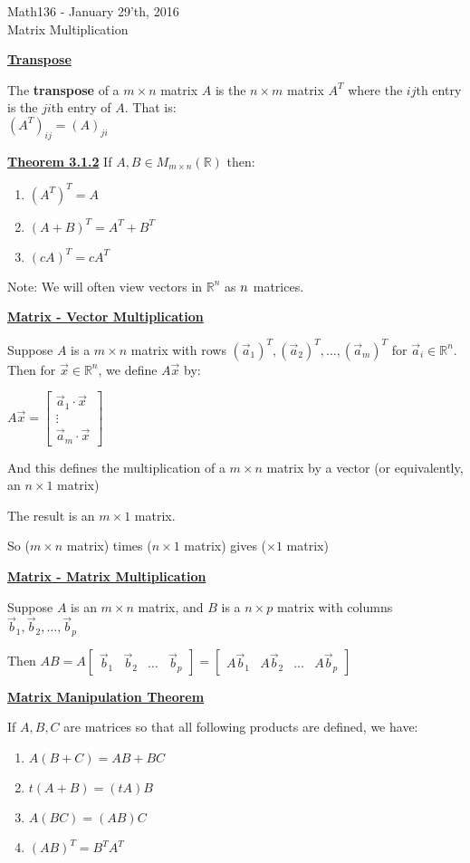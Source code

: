 \documentclass{letter}
\newcommand{\0}[1]{\begin{bmatrix}#1\end{bmatrix}}
\newcommand{\h}[1]{\underline{\textbf{#1}}}
\begin{document}
	\begin{center}
		\LARGE Math136 - January 29'th, 2016\\
		\large Matrix Multiplication
	\end{center}
	\vspace{0.25 in}
	
	\h{Transpose}
	
	The \textbf{transpose} of a $m \times n$ matrix $A$ is the $n \times m$ matrix $A^T$ where the $ij$th entry is the $ji$th entry of $A$. That is:\\
	$(A^T)_{ij} = (A)_{ji}$
	
	\h{Theorem 3.1.2} If $A, B \in M_{m\times n} (\mathbb{R})$ then:
	\begin{enumerate}[1)]
		\item $(A^T)^T = A$
		\item $(A+B)^T = A^T + B^T$
		\item $(cA)^T = cA^T$
	\end{enumerate}
	
	Note: We will often view vectors in $\mathbb{R}^n$ as $n \time 1$ matrices.
	
	\h{Matrix - Vector Multiplication}
	
	Suppose $A$ is a $m \times n$ matrix with rows $(\vec a_1)^T, (\vec a_2)^T, \dots, (\vec a_m)^T$ for $\vec a_i \in \mathbb{R}^n$. Then for $\vec x \in \mathbb{R}^n$, we define $A\vec x$ by:
	
	$A\vec x = \0{\vec a_1 \cdot \vec x\\\vdots\\\vec a_m \cdot \vec x}$
	
	And this defines the multiplication of a $m \times n$ matrix by a vector (or equivalently, an $n \times 1$ matrix)
	
	The result is an $m \times 1$ matrix.
	
	So ($m \times n$ matrix) times ($n \times 1$ matrix) gives ($ \times 1$ matrix)
	
	\h{Matrix - Matrix Multiplication}
	
	Suppose $A$ is an $m \times n$ matrix, and $B$ is a $n \times p$ matrix with columns $\vec b_1, \vec b_2, \dots, \vec b_p$
	
	Then $AB = A\0{\vec b_1&\vec b_2&\dots & \vec b_p} = \0{A\vec b_1&A\vec b_2&\dots&A\vec b_p}$
	
	\h{Matrix Manipulation Theorem}
	
	If $A, B, C$ are matrices so that all following products are defined, we have:
	\begin{enumerate}[1)]
		\item $A(B+C) = AB + BC$
		\item $t(A+B) = (tA)B$
		\item $A(BC) = (AB)C$
		\item $(AB)^T = B^TA^T$
	\end{enumerate}
\end{document}
